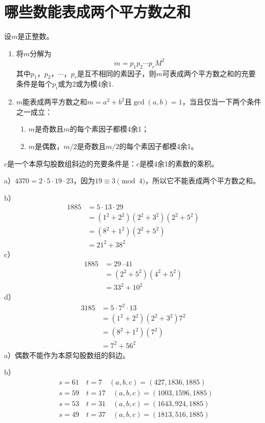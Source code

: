 \chapter{哪些数能表成两个平方数之和}
\begin{theorem}[两平方数之和定理]
设$m$是正整数。
\begin{enumerate}
\item 将$m$分解为
\[m=p_1p_2\cdots p_r M^2\]
其中$p_1$，$p_2$，$\cdots$，$p_r$是互不相同的素因子，则$m$可表成两个平方数之和的充要条件是每个$p_i$或为2或为模4余1.
\item $m$能表成两平方数之和$m=a^2+b^2$且$\gcd(a,b)=1$，当且仅当一下两个条件之一成立：
\begin{enumerate}
\item $m$是奇数且$m$的每个素因子都模4余1；
\item $m$是偶数，$m/2$是奇数且$m/2$的每个素因子都模4余1。
\end{enumerate}
\end{enumerate}
\end{theorem}
\begin{theorem}[毕达哥拉斯斜边命题]
$c$是一个本原勾股数组斜边的充要条件是：$c$是模4余1的素数的乘积。
\end{theorem}
%
\exercise a）$4370=2\cdot5\cdot19\cdot23$，因为$19\equiv3\pmod4$，所以它不能表成两个平方数之和。\par
b）
\begin{align*}
1885&=5\cdot13\cdot29 \\
&=(1^2+2^2)(2^2+3^2)(2^2+5^2)\\
&=(8^2+1^2)(2^2+5^2) \\
&=21^2+38^2 
\end{align*}
c）
\begin{align*}
1885&=29\cdot41\\
&=(2^2+5^2)(4^2+5^2)\\
&=33^2+10^2
\end{align*}
d）
\begin{align*}
3185&=5\cdot7^2\cdot13\\
&=(1^2+2^2)(2^2+3^2)7^2\\
&=(8^2+1^2)(7^2)\\
&=7^2+56^2
\end{align*}
%
\exercise a）偶数不能作为本原勾股数组的斜边。\par
b）
\begin{align*}
&s=61\quad t=7\quad (a,b,c)=(427, 1836, 1885)\\
&s=59\quad t=17\quad (a,b,c)=(1003, 1596, 1885)\\
&s=53\quad t=31\quad (a,b,c)=(1643, 924, 1885)\\
&s=49\quad t=37\quad (a,b,c)=(1813, 516, 1885)
\end{align*}
